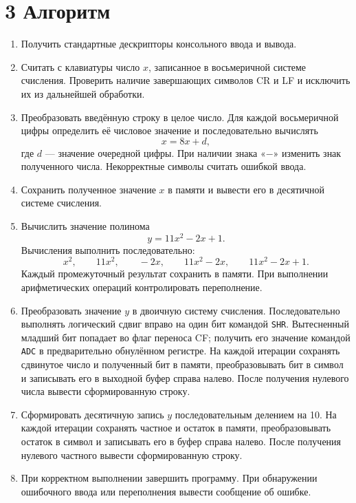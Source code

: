 \documentclass[12pt,a4paper]{article}
\begin{document}
\section*{3 Алгоритм}
\begin{enumerate}
\item Получить стандартные дескрипторы консольного ввода и вывода.
\item Считать с клавиатуры число $x$, записанное в восьмеричной системе счисления.
Проверить наличие завершающих символов CR и LF и исключить их из дальнейшей обработки.
\item Преобразовать введённую строку в целое число. Для каждой восьмеричной цифры
определить её числовое значение и последовательно вычислять
\[
x = 8x + d,
\]
где $d$ --- значение очередной цифры. При наличии знака «$-$» изменить знак
полученного числа. Некорректные символы считать ошибкой ввода.
\item Сохранить полученное значение $x$ в памяти и вывести его в десятичной
системе счисления.
\item Вычислить значение полинома
\[
y = 11x^2 - 2x + 1.
\]
Вычисления выполнить последовательно:
\[
x^2,\qquad 11x^2,\qquad -2x,\qquad
11x^2-2x,\qquad 11x^2-2x+1.
\]
Каждый промежуточный результат сохранить в памяти. При выполнении арифметических
операций контролировать переполнение.
\item Преобразовать значение $y$ в двоичную систему счисления. Последовательно
выполнять логический сдвиг вправо на один бит командой \texttt{SHR}.
Вытесненный младший бит попадает во флаг переноса CF; получить его значение
командой \texttt{ADC} в предварительно обнулённом регистре.
На каждой итерации сохранять сдвинутое число и полученный бит в памяти,
преобразовывать бит в символ и записывать его в выходной буфер справа налево.
После получения нулевого числа вывести сформированную строку.
\item Сформировать десятичную запись $y$ последовательным делением на 10.
На каждой итерации сохранять частное и остаток в памяти, преобразовывать остаток
в символ и записывать его в буфер справа налево. После получения нулевого
частного вывести сформированную строку.
\item При корректном выполнении завершить программу. При обнаружении ошибочного
ввода или переполнения вывести сообщение об ошибке.
\end{enumerate}
\end{document}
